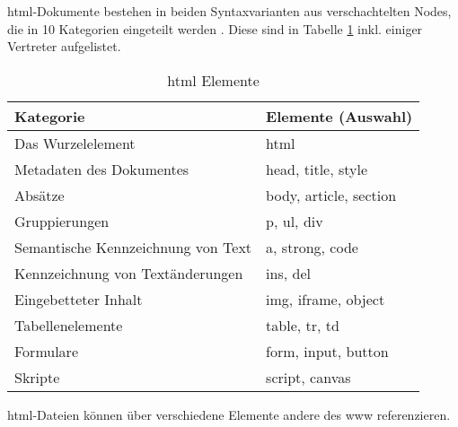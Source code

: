             \gls{html}-Dokumente bestehen in beiden Syntaxvarianten aus verschachtelten
            Nodes, die in 10 Kategorien eingeteilt werden \cite[Kapitel 4]{w3c:html5}.
            Diese sind in Tabelle \ref{table:htmlElements} inkl. einiger Vertreter aufgelistet.

            \begin{table}[h]
                \centering
                \begin{tabular}{|l|l|}
                \hline
                \textbf{Kategorie} & \textbf{Elemente (Auswahl)} \\
                \hline
                Das Wurzelelement & html \\
                \hline
                Metadaten des Dokumentes & head, title, style \\
                \hline
                Absätze & body, article, section \\
                \hline
                Gruppierungen & p, ul, div \\
                \hline
                Semantische Kennzeichnung von Text & a, strong, code \\
                \hline
                Kennzeichnung von Textänderungen & ins, del \\
                \hline
                Eingebetteter Inhalt & img, iframe, object \\
                \hline
                Tabellenelemente & table, tr, td \\
                \hline
                Formulare & form, input, button \\
                \hline
                Skripte & script, canvas \\
                \hline
                \end{tabular}
                \caption{\gls{html} Elemente}
                \label{table:htmlElements}
            \end{table}

            \gls{html}-Dateien können über verschiedene Elemente andere {\resources} des \gls{www} referenzieren.

